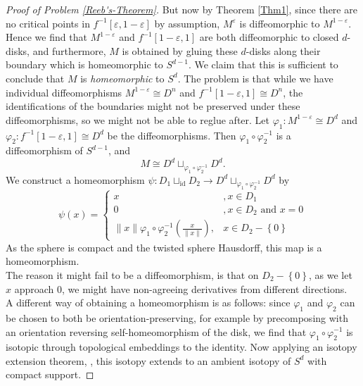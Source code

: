\documentclass[reqno]{amsart}
\theoremstyle{definition}
\theoremstyle{remark}
\newcommand{\id}{{\mathrm{id}}}
\begin{document}
\begin{proof}[Proof of Problem \ref{Reeb's-Theorem}]
         But now by Theorem \ref{Thm1}, since
         there are no critical points in
         $f^{-1}\left[ \varepsilon, 1- \varepsilon \right] $ 
         by assumption,
         $M^{\varepsilon}$ is diffeomorphic to
         $M^{1- \varepsilon}$.
         Hence we find that
         $M^{1-\varepsilon}$ and
         $f^{-1}\left[ 1-\varepsilon,1 \right] $ 
         are both diffeomorphic to closed $d$-disks, and
         furthermore,
         $M$ is obtained by gluing these  $d$-disks along their
         boundary which
         is homeomorphic to
         $S^{d-1}$. We claim that this is sufficient
         to conclude that $M$ is \textit{homeomorphic} to
         $S^{d}$.
         The problem is that while
         we have individual diffeomorphisms
         $M^{1-\varepsilon} \cong
         D^{n}$ and
         $f^{-1}\left[ 1-\varepsilon,1 \right] 
         \cong D^{n}$, the identifications of the boundaries
         might not be preserved under these diffeomorphisms,
         so we might not be able to reglue after.
         Let
         $\varphi_1 \colon M^{1- \varepsilon}
         \cong D^{d}$ and
         $\varphi_2 \colon
         f^{-1}\left[ 1-\varepsilon,1 \right] 
         \cong D^{d}$ be the diffeomorphisms.
         Then 
         $\varphi_1 \circ \varphi_2^{-1}$ is a diffeomorphism
         of $S^{d-1}$, and
         \[
         M \cong D^{d} \sqcup_{\varphi_1 \circ \varphi_2^{-1}}
         D^{d}.
         \] 
         We construct a homeomorphism
         $\psi \colon D_1 \sqcup_{\id} D_2 \to 
         D^{d} \sqcup_{\varphi_1 \circ \varphi_2^{-1}}
         D^{d}$ by
         \[
         \psi (x)
         =
         \begin{cases}
             x&, x \in D_1\\
             0&, x \in D_2 \text{ and } x = 0\\
             \|x\| \varphi_1 \circ
             \varphi_2^{-1} \left( \frac{x}{\|x\|} \right) ,&
             x \in D_2 - \left\{ 0 \right\} 
         \end{cases}
         \] 
         As the sphere is compact and
          the twisted sphere Hausdorff, this
          map is a homeomorphism.\\
          The reason it might fail to be a diffeomorphism, is
          that on $D_2 - \left\{ 0 \right\} $, as
          we  let $x$ approach $0$, we might have
          non-agreeing derivatives from different directions.\\
          \linebreak
          A different way of obtaining a homeomorphism
          is as follows: since
          $\varphi_1$ and $\varphi_2$ can be
          chosen to both be orientation-preserving, for example
          by precomposing with an orientation reversing
          self-homeomorphism of the disk, we find that
          $\varphi_1 \circ \varphi_2^{-1}$ is isotopic through
          topological embeddings to the identity. Now
          applying an isotopy extension theorem,
          \cite[Thm 1.3, p. 180]{Hirsch}, this isotopy
          extends to an ambient isotopy of
          $S^{d}$ with compact support.


    \end{proof}
\end{document}
